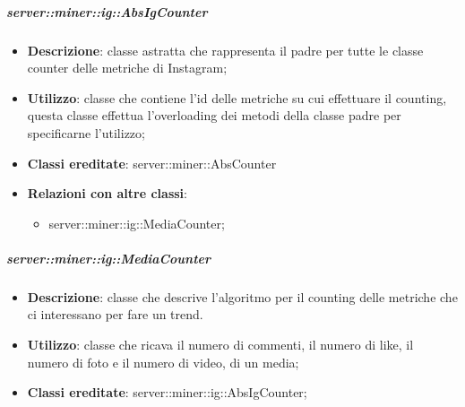 	\subparagraph{server::miner::ig::AbsIgCounter} %
		\label{subp:server_miner_ig_AbsIgCounter}
			\begin{itemize}
				\item \textbf{Descrizione}: classe astratta che rappresenta il padre per tutte le classe counter delle metriche di Instagram;
				\item \textbf{Utilizzo}: classe che contiene l’id delle metriche su cui effettuare il counting, questa classe effettua l’overloading dei metodi della classe padre per specificarne l’utilizzo;
				\item \textbf{Classi ereditate}: server::miner::AbsCounter
				\item \textbf{Relazioni con altre classi}:
					\begin{itemize}
						\item server::miner::ig::MediaCounter;
					\end{itemize}
			\end{itemize}
		
		
	\subparagraph{server::miner::ig::MediaCounter} %
		\label{subp:server_miner_ig_MediaCounter}
			\begin{itemize}
				\item \textbf{Descrizione}: classe che descrive l’algoritmo per il counting delle metriche che ci interessano per fare un trend.
				\item \textbf{Utilizzo}: classe che ricava il numero di commenti, il numero di like, il numero di foto e il numero di video, di un media;
				\item \textbf{Classi ereditate}: server::miner::ig::AbsIgCounter;
			\end{itemize}

		
